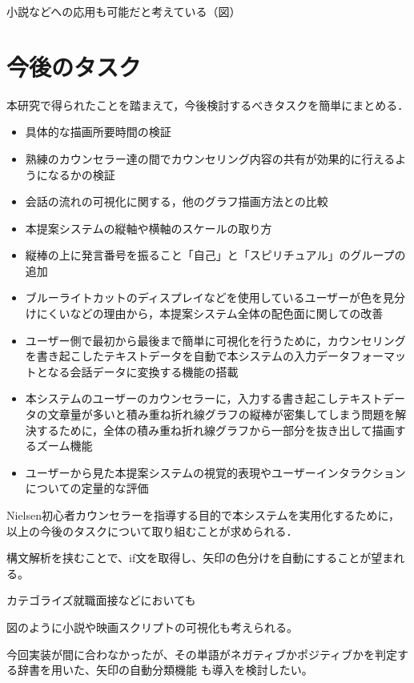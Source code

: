 \documentclass[shuuron]{kuee}
\begin{document}
小説などへの応用も可能だと考えている（図）

\section{今後のタスク}

本研究で得られたことを踏まえて，今後検討するべきタスクを簡単にまとめる．

\begin{itemize}
  \item 具体的な描画所要時間の検証
  \item 熟練のカウンセラー達の間でカウンセリング内容の共有が効果的に行えるようになるかの検証
  \item 会話の流れの可視化に関する，他のグラフ描画方法との比較
  \item 本提案システムの縦軸や横軸のスケールの取り方
  \item 縦棒の上に発言番号を振ること「自己」と「スピリチュアル」のグループの追加
  \item ブルーライトカットのディスプレイなどを使用しているユーザーが色を見分けにくいなどの理由から，本提案システム全体の配色面に関しての改善
  \item ユーザー側で最初から最後まで簡単に可視化を行うために，カウンセリングを書き起こしたテキストデータを自動で本システムの入力データフォーマットとなる会話データに変換する機能の搭載
  \item 本システムのユーザーのカウンセラーに，入力する書き起こしテキストデータの文章量が多いと積み重ね折れ線グラフの縦棒が密集してしまう問題を解決するために，全体の積み重ね折れ線グラフから一部分を抜き出して描画するズーム機能
  \item ユーザーから見た本提案システムの視覚的表現やユーザーインタラクションについての定量的な評価
\end{itemize}

Nielsen初心者カウンセラーを指導する目的で本システムを実用化するために，以上の今後のタスクについて取り組むことが求められる．%


構文解析を挟むことで、if文を取得し、矢印の色分けを自動にすることが望まれる。

カテゴライズ就職面接などにおいても

図のように小説や映画スクリプトの可視化も考えられる。

今回実装が間に合わなかったが、その単語がネガティブかポジティブかを判定する辞書を用いた、矢印の自動分類機能\cite{小林のぞみ2005意見抽出のための評価表現の収集} \cite{東山昌彦2008述語の選択選好性に着目した名詞評価極性の獲得} も導入を検討したい。
\end{document}
